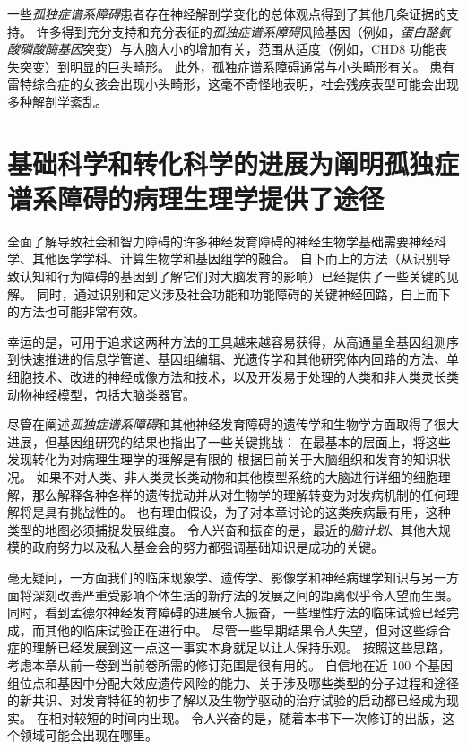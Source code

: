 一些\textit{孤独症谱系障碍}患者存在神经解剖学变化的总体观点得到了其他几条证据的支持。
许多得到充分支持和充分表征的\textit{孤独症谱系障碍}风险基因（例如，\textit{蛋白酪氨酸磷酸酶基因}突变）与大脑大小的增加有关，范围从适度（例如，CHD8 功能丧失突变）到明显的巨头畸形。
此外，孤独症谱系障碍通常与小头畸形有关。
患有雷特综合症的女孩会出现小头畸形，这毫不奇怪地表明，社会残疾表型可能会出现多种解剖学紊乱。



\section{基础科学和转化科学的进展为阐明孤独症谱系障碍的病理生理学提供了途径}

全面了解导致社会和智力障碍的许多神经发育障碍的神经生物学基础需要神经科学、其他医学学科、计算生物学和基因组学的融合。
自下而上的方法（从识别导致认知和行为障碍的基因到了解它们对大脑发育的影响）已经提供了一些关键的见解。
同时，通过识别和定义涉及社会功能和功能障碍的关键神经回路，自上而下的方法也可能非常有效。


幸运的是，可用于追求这两种方法的工具越来越容易获得，从高通量全基因组测序到快速推进的信息学管道、基因组编辑、光遗传学和其他研究体内回路的方法、单细胞技术、改进的神经成像方法和技术，以及开发易于处理的人类和非人类灵长类动物神经模型，包括大脑类器官。


尽管在阐述\textit{孤独症谱系障碍}和其他神经发育障碍的遗传学和生物学方面取得了很大进展，但基因组研究的结果也指出了一些关键挑战：
在最基本的层面上，将这些发现转化为对病理生理学的理解是有限的 根据目前关于大脑组织和发育的知识状况。
如果不对人类、非人类灵长类动物和其他模型系统的大脑进行详细的细胞理解，那么解释各种各样的遗传扰动并从对生物学的理解转变为对发病机制的任何理解将是具有挑战性的。
也有理由假设，为了对本章讨论的这类疾病最有用，这种类型的地图必须捕捉发展维度。
令人兴奋和振奋的是，最近的\textit{脑计划}、其他大规模的政府努力以及私人基金会的努力都强调基础知识是成功的关键。


毫无疑问，一方面我们的临床现象学、遗传学、影像学和神经病理学知识与另一方面将深刻改善严重受影响个体生活的新疗法的发展之间的距离似乎令人望而生畏。
同时，看到孟德尔神经发育障碍的进展令人振奋，一些理性疗法的临床试验已经完成，而其他的临床试验正在进行中。
尽管一些早期结果令人失望，但对这些综合症的理解已经发展到这一点这一事实本身就足以让人保持乐观。
按照这些思路，考虑本章从前一卷到当前卷所需的修订范围是很有用的。
自信地在近 100 个基因组位点和基因中分配大效应遗传风险的能力、关于涉及哪些类型的分子过程和途径的新共识、对发育特征的初步了解以及生物学驱动的治疗试验的启动都已经成为现实。
在相对较短的时间内出现。
令人兴奋的是，随着本书下一次修订的出版，这个领域可能会出现在哪里。



